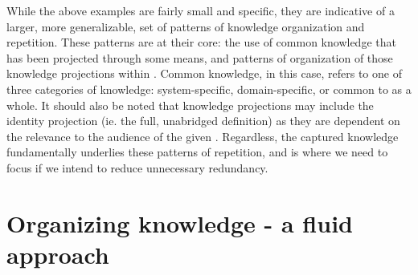 While the above examples are fairly small and specific, they are indicative of 
a larger, more generalizable, set of patterns of knowledge organization and 
repetition. These patterns are at their core: the use of common knowledge that 
has been projected through some means, and patterns of organization of those 
knowledge projections within \sfs{}. Common knowledge, in this case, refers to 
one of three categories of knowledge: system-specific, domain-specific, or 
common to \sfs{} as a whole. It should also be noted that knowledge projections 
may include the identity projection (ie. the full, unabridged definition) as 
they are dependent on the relevance to the audience of the given \sf{}. 
Regardless, the captured knowledge fundamentally underlies these patterns of 
repetition, and is where we need to focus if we intend to reduce unnecessary 
redundancy.

\section{Organizing knowledge - a fluid approach}
%
%


